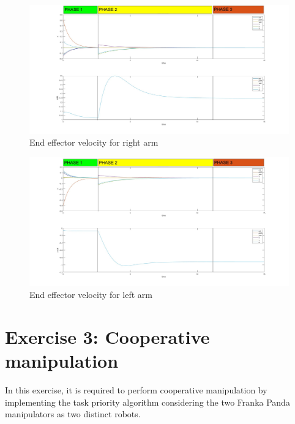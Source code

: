 \documentclass{article}
\begin{document}
\begin{figure}[h]
	\centering
	\includegraphics[width=1\textwidth]{imgs/ex2/velocity right.jpg}
	\caption{\label{fig:1} End effector velocity for right arm}
\end{figure}

\begin{figure}[h]
	\centering
	\includegraphics[width=1\textwidth]{imgs/ex2/velocity left .jpg}
	\caption{\label{fig:1} End effector velocity for left arm}
\end{figure}

\clearpage

\section{Exercise 3: Cooperative manipulation}
In this exercise, it is required to perform cooperative manipulation by implementing the task priority algorithm considering the two Franka Panda manipulators as two distinct robots. 
\end{document}
